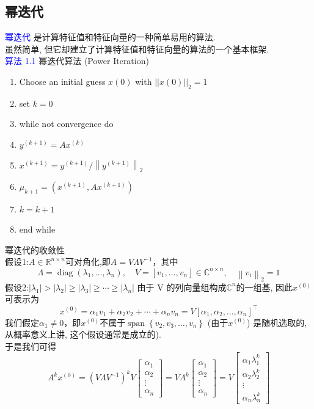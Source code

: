 \documentclass[12pt,a4paper]{article}
\begin{document}
	\subsection{幂迭代}
	\textcolor{blue}{幂迭代} 是计算特征值和特征向量的一种简单易用的算法.\\
	虽然简单, 但它却建立了计算特征值和特征向量的算法的一个基本框架.\\
	\textcolor{blue}{算法 1.1} 幂迭代算法 (Power Iteration)
	\begin{enumerate}[1:]
		\item Choose an initial guess $x(0)$ with $||x(0)||_{2} = 1$
		\item set $k=0$
		\item while not convergence do
		\item \qquad$y^{(k+1)} = Ax^{(k)}$
		\item \qquad$x^{(k+1)}=y^{(k+1)} /\left\|y^{(k+1)}\right\|_{2}$
		\item \qquad$\mu_{k+1}=\left(x^{(k+1)}, A x^{(k+1)}\right)$
		\item \qquad$k=k+1$
		\item end while
	\end{enumerate}
	幂迭代的收敛性\\
	假设1:$A \in \mathbb{R}^{n \times n}$可对角化,即$A=V \Lambda V^{-1}$，其中
	$$
	\Lambda=\operatorname{diag}\left(\lambda_{1}, \ldots, \lambda_{n}\right), \quad V=\left[v_{1}, \ldots, v_{n}\right] \in \mathbb{C}^{n \times n}, \quad\left\|v_{i}\right\|_{2}=1
	$$
	假设2:$\left|\lambda_{1}\right|>\left|\lambda_{2}\right| \geq\left|\lambda_{3}\right| \geq \cdots \geq\left|\lambda_{n}\right|$
	由于 V 的列向量组构成$\mathbb{C}^{n}$的一组基, 因此$x^{(0)}$可表示为
	$$
	x^{(0)}=\alpha_{1} v_{1}+\alpha_{2} v_{2}+\cdots+\alpha_{n} v_{n}=V\left[\alpha_{1}, \alpha_{2}, \ldots, \alpha_{n}\right]^{\top}
	$$
	我们假定$\alpha_{1} \neq 0$，即$x^{(0)}$不属于$\operatorname{span}\left\{v_{2}, v_{3}, \ldots, v_{n}\right\}$
	(由于$x^{(0)}$) 是随机选取的, 从概率意义上讲, 这个假设通常是成立的).\\
	于是我们可得
	$$
	A^{k} x^{(0)}=\left(V \Lambda V^{-1}\right)^{k} V\left[\begin{array}{c}{\alpha_{1}} \\ {\alpha_{2}} \\ {\vdots} \\ {\alpha_{n}}\end{array}\right]=V \Lambda^{k}\left[\begin{array}{c}{\alpha_{1}} \\ {\alpha_{2}} \\ {\vdots} \\ {\alpha_{n}}\end{array}\right]=V\left[\begin{array}{c}{\alpha_{1} \lambda_{1}^{k}} \\ {\alpha_{2} \lambda_{2}^{k}} \\ {\vdots} \\ {\alpha_{n} \lambda_{n}^{k}}\end{array}\right]
	$$
\end{document}
